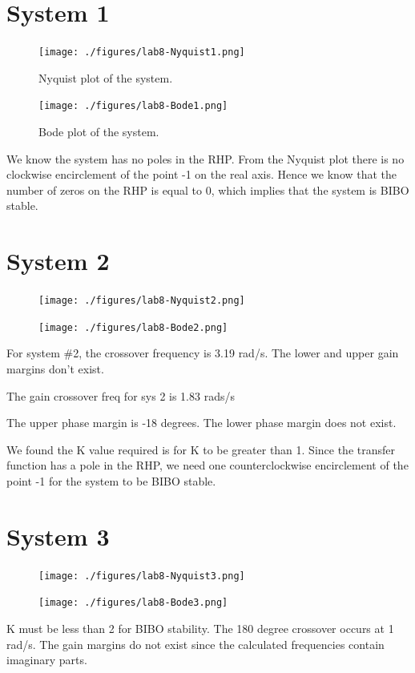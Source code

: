 
\section{System 1}
\begin{figure}[H]
	\centering
	\texttt{[image: ./figures/lab8-Nyquist1.png]}
	\caption{Nyquist plot of the system.}
	\label{fig:}
\end{figure}

\begin{figure}[H]
	\centering
	\texttt{[image: ./figures/lab8-Bode1.png]}
	\caption{Bode plot of the system.}
	\label{fig:}
\end{figure}

We know the system has no poles in the RHP. From the Nyquist plot there is no clockwise encirclement of the point -1 on the real axis. Hence we know that the number of zeros on the RHP is equal to 0, which implies that the system is BIBO stable.

\section{System 2}

\begin{figure}[H]
	\centering
	\texttt{[image: ./figures/lab8-Nyquist2.png]}
	\caption{}
	\label{fig:}
\end{figure}
\begin{figure}[H]
	\centering
	\texttt{[image: ./figures/lab8-Bode2.png]}
	\caption{}
	\label{fig:}
\end{figure}
For system \#2, the crossover frequency is 3.19 rad/s. The lower and upper gain margins don't exist.

The gain crossover freq for sys 2 is 1.83 rads/s

The upper phase margin is -18 degrees. The lower phase margin does not exist.

We found the K value required is for K to be greater than 1. Since the transfer function has a pole in the RHP, we need one counterclockwise encirclement of the point -1 for the system to be BIBO stable. 

\section{System 3}

\begin{figure}[H]
	\centering
	\texttt{[image: ./figures/lab8-Nyquist3.png]}
	\caption{}
	\label{fig:}
\end{figure}
\begin{figure}[H]
	\centering
	\texttt{[image: ./figures/lab8-Bode3.png]}
	\caption{}
	\label{fig:}
\end{figure}
K must be less than 2 for BIBO stability. The 180 degree crossover occurs at 1 rad/s. The gain margins do not exist since the calculated frequencies contain imaginary parts.


